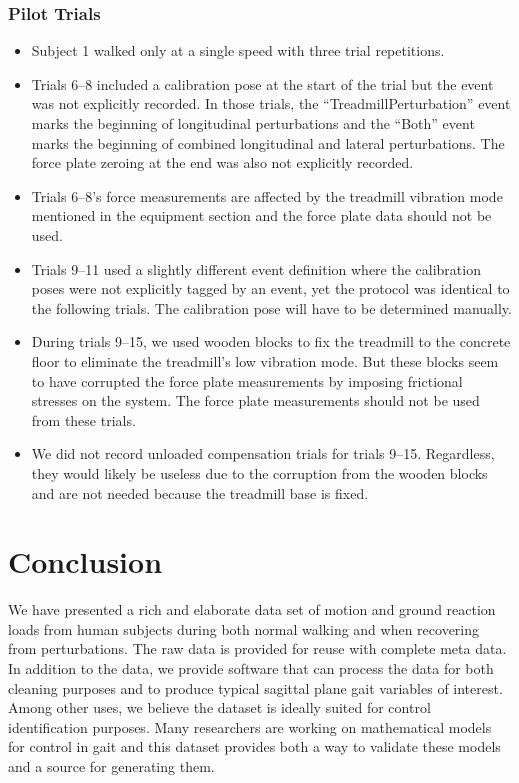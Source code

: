 \documentclass[fleqn,12pt]{wlpeerj}
\begin{document}
\subsubsection*{Pilot Trials}
%
\begin{itemize}
  \item Subject 1 walked only at a single speed with three trial repetitions.
  \item Trials 6--8 included a calibration pose at the start of the trial but
    the event was not explicitly recorded. In those trials, the
    ``TreadmillPerturbation'' event marks the beginning of longitudinal
    perturbations and the ``Both'' event marks the beginning of combined
    longitudinal and lateral perturbations. The force plate zeroing at the end
    was also not explicitly recorded.
  \item Trials 6--8's force measurements are affected by the treadmill vibration
    mode mentioned in the equipment section and the force plate data should not
    be used.
  \item Trials 9--11 used a slightly different event definition where the
    calibration poses were not explicitly tagged by an event, yet the protocol
    was identical to the following trials. The calibration pose will have to be
    determined manually.
  \item During trials 9--15, we used wooden blocks to fix the treadmill to the
    concrete floor to eliminate the treadmill's low vibration mode. But these
    blocks seem to have corrupted the force plate measurements by imposing
    frictional stresses on the system. The force plate measurements should not
    be used from these trials.
  \item We did not record unloaded compensation trials for trials 9--15.
    Regardless, they would likely be useless due to the corruption from the
    wooden blocks and are not needed because the treadmill base is fixed.
\end{itemize}

\section*{Conclusion}
%
We have presented a rich and elaborate data set of motion and ground reaction
loads from human subjects during both normal walking and when recovering from
perturbations. The raw data is provided for reuse with complete meta data. In
addition to the data, we provide software that can process the data for both
cleaning purposes and to produce typical sagittal plane gait variables of
interest. Among other uses, we believe the dataset is ideally suited for
control identification purposes. Many researchers are working on mathematical
models for control in gait and this dataset provides both a way to validate
these models and a source for generating them.
\end{document}
